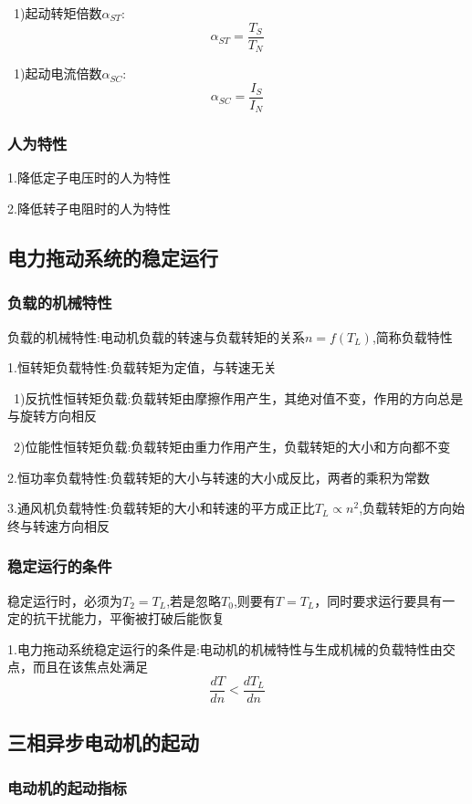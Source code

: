 \documentclass[11pt,twoside,a4paper]{ctexart}
\begin{document}
\ 1)起动转矩倍数$\alpha _{ST}$:
\[\alpha _{ST} = \frac{T_S}{T_N}\]

\ 1)起动电流倍数$\alpha _{SC}$:
\[\alpha _{SC} = \frac{I_S}{I_N}\]

\subsubsection{人为特性}

1.降低定子电压时的人为特性

2.降低转子电阻时的人为特性

\subsection{电力拖动系统的稳定运行}

\subsubsection{负载的机械特性}

负载的机械特性:电动机负载的转速与负载转矩的关系$n = f(T_L)$,简称负载特性

1.恒转矩负载特性:负载转矩为定值，与转速无关

\ 1)反抗性恒转矩负载:负载转矩由摩擦作用产生，其绝对值不变，作用的方向总是与旋转方向相反

\ 2)位能性恒转矩负载:负载转矩由重力作用产生，负载转矩的大小和方向都不变

2.恒功率负载特性:负载转矩的大小与转速的大小成反比，两者的乘积为常数

3.通风机负载特性:负载转矩的大小和转速的平方成正比$T_L\propto  n^2$,负载转矩的方向始终与转速方向相反

\subsubsection{稳定运行的条件}

稳定运行时，必须为$T_2 = T_L$,若是忽略$T_0$,则要有$T = T_L$，同时要求运行要具有一定的抗干扰能力，平衡被打破后能恢复

1.电力拖动系统稳定运行的条件是:电动机的机械特性与生成机械的负载特性由交点，而且在该焦点处满足
\[\frac{dT}{dn} < \frac{dT_L}{dn}\]

\subsection{三相异步电动机的起动}

\subsubsection{电动机的起动指标}
\end{document}
